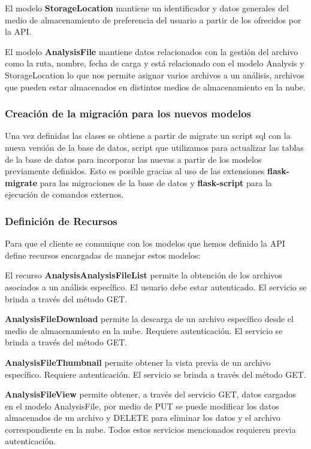 El modelo \textbf{StorageLocation} mantiene un identificador y datos generales del medio de almacenamiento de preferencia del usuario a partir de los ofrecidos por la API.

El modelo \textbf{AnalysisFile} mantiene datos relacionados con la gestión del archivo como la ruta, nombre, fecha de carga y está relacionado con el modelo Analysis y StorageLocation lo que nos permite asignar varios archivos a un análisis, archivos que pueden estar almacenados en distintos medios de almacenamiento en la nube.

\subsubsection{Creación de la migración para los nuevos modelos}

Una vez definidas las clases se obtiene a partir de migrate un script sql con la nueva versión de la base de datos, script que utilizamos para actualizar las tablas de la base de datos para incorporar las nuevas a partir de los modelos previamente definidos. Esto es posible gracias al uso de las extensiones \textbf{flask-migrate} para las migraciones de la base de datos y \textbf{flask-script} para la ejecución de comandos externos.

\subsubsection{Definición de Recursos}

Para que el cliente se comunique con los modelos que hemos definido la API define recursos encargadas de manejar estos modelos:

El recurso \textbf{AnalysisAnalysisFileList} permite la obtención de los archivos asociados a un análisis específico. El usuario debe estar autenticado. El servicio se brinda a través del método GET.

\textbf{AnalysisFileDownload} permite la descarga de un archivo específico desde el medio de almacenamiento en la nube. Requiere autenticación. El servicio se brinda a través del método GET.

\textbf{AnalysisFileThumbnail} permite obtener la vista previa de un archivo específico. Requiere autenticación. El servicio se brinda a través del método GET.

\textbf{AnalysisFileView} permite obtener, a través del servicio GET, datos cargados en el modelo AnalysisFile, por medio de PUT se  puede modificar los datos almacenados de un archivo y DELETE para eliminar los datos y el archivo correspondiente en la nube. Todos estos servicios mencionados requieren previa autenticación.

